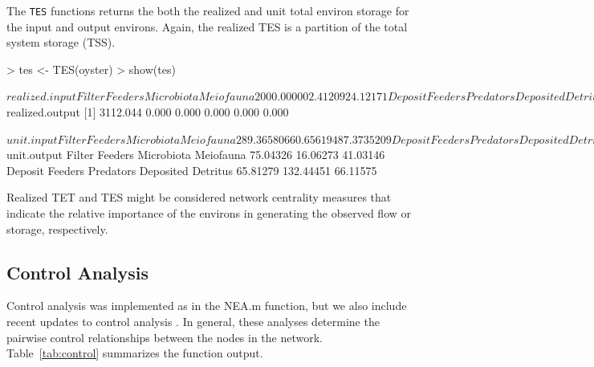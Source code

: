 \documentclass[article]{jss}
\begin{document}
The \texttt{TES} functions returns the both the realized and unit
total environ storage for the input and output environs.  Again, the
realized TES is a partition of the total system storage (TSS).

\begin{Schunk}
\begin{Sinput}
> tes <- TES(oyster)
> show(tes)
\end{Sinput}
\begin{Soutput}
$realized.input
    Filter Feeders         Microbiota          Meiofauna 
        2000.00000            2.41209           24.12171 
   Deposit Feeders          Predators Deposited Detritus 
          16.27440           69.23803         1000.03118 

$realized.output
[1] 3112.044    0.000    0.000    0.000    0.000    0.000

$unit.input
    Filter Feeders         Microbiota          Meiofauna 
       289.3658066          0.6561948          7.3735209 
   Deposit Feeders          Predators Deposited Detritus 
        11.5308112        109.7205293        265.1036470 

$unit.output
    Filter Feeders         Microbiota          Meiofauna 
          75.04326           16.06273           41.03146 
   Deposit Feeders          Predators Deposited Detritus 
          65.81279          132.44451           66.11575 
\end{Soutput}
\end{Schunk}

Realized TET and TES might be considered network centrality measures that
indicate the relative importance of the environs in generating
the observed flow or storage, respectively.

\subsection{Control Analysis}


Control analysis was implemented as in the NEA.m function,
but we also include recent updates to control analysis
\citep[e.g.,][]{schramski06, schramski07}.  In general, these analyses
determine the pairwise control relationships between the nodes in the
network.  Table~\ref{tab:control} summarizes the function output.
\end{document}
